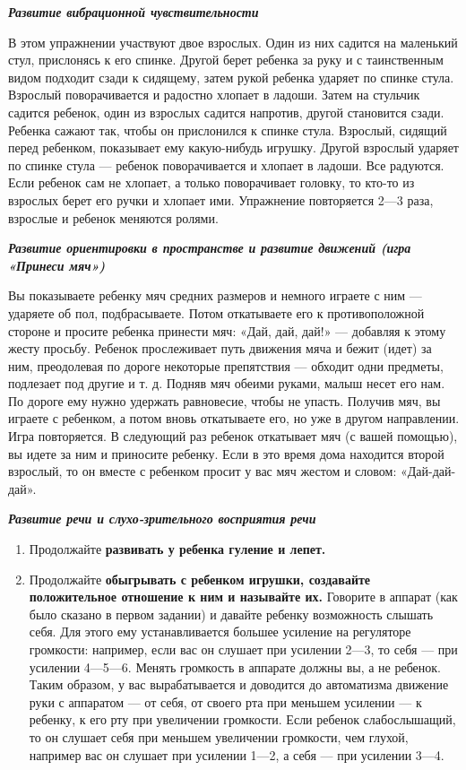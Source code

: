 \documentclass[a5paper]{book}
\renewcommand{\emph}[1]{\textit{#1}}
\begin{document}
\emph{\textbf{Развитие вибрационной чувствительности}}

В этом упражнении участвуют двое взрослых. Один из них садится на
маленький стул, прислонясь к его спинке. Другой берет ребенка за руку и
с таинственным видом подходит сзади к сидящему, затем рукой ребенка
ударяет по спинке стула. Взрослый поворачивается и радостно хлопает в
ладоши. Затем на стульчик садится ребенок, один из взрослых садится
напротив, другой становится сзади. Ребенка сажают так, чтобы он
прислонился к спинке стула. Взрослый, сидящий перед ребенком, показывает
ему какую-нибудь игрушку. Другой взрослый ударяет по спинке стула ---
ребенок поворачивается и хлопает в ладоши. Все радуются. Если ребенок
сам не хлопает, а только поворачивает головку, то кто-то из взрослых
берет его ручки и хлопает ими. Упражнение повторяется 2---3 раза,
взрослые и ребенок меняются ролями.

\emph{\textbf{Развитие ориентировки в пространстве и развитие движений
(игра «Принеси мяч»)}}

Вы показываете ребенку мяч средних размеров и немного играете с ним ---
ударяете об пол, подбрасываете. Потом откатываете его к противоположной
стороне и просите ребенка принести мяч: «Дай, дай, дай!» --- добавляя к
этому жесту просьбу. Ребенок прослеживает путь движения мяча и бежит
(идет) за ним, преодолевая по дороге некоторые препятствия --- обходит
одни предметы, подлезает под другие и т. д. Подняв мяч обеими руками,
малыш несет его нам. По дороге ему нужно удержать равновесие, чтобы не
упасть. Получив мяч, вы играете с ребенком, а потом вновь откатываете
его, но уже в другом направлении. Игра повторяется. В следующий раз
ребенок откатывает мяч (с вашей помощью), вы идете за ним и приносите
ребенку. Если в это время дома находится второй взрослый, то он вместе с
ребенком просит у вас мяч жестом и словом: «Дай-дай-дай».

\emph{\textbf{Развитие речи и слухо-зрительного восприятия речи}}


\begin{enumerate}
\def\labelenumi{\arabic{enumi}.}
\item
  
  Продолжайте \textbf{развивать у ребенка гуление и лепет.}
  
\item
  
  Продолжайте \textbf{обыгрывать с ребенком игрушки, создавайте
  положительное отношение к ним и называйте их.} Говорите в аппарат (как
  было сказано в первом задании) и давайте ребенку возможность слышать
  себя. Для этого ему устанавливается большее усиление на регуляторе
  громкости: например, если вас он слушает при усилении 2---3, то себя
  --- при усилении 4---5---6. Менять громкость в аппарате должны вы, а
  не ребенок. Таким образом, у вас вырабатывается и доводится до
  автоматизма движение руки с аппаратом --- от себя, от своего рта при
  меньшем усилении --- к ребенку, к его рту при увеличении громкости.
  Если ребенок слабослышащий, то он слушает себя при меньшем увеличении
  громкости, чем глухой, например вас он слушает при усилении 1---2, а
  себя --- при усилении 3---4.
  
\end{enumerate}
\end{document}
